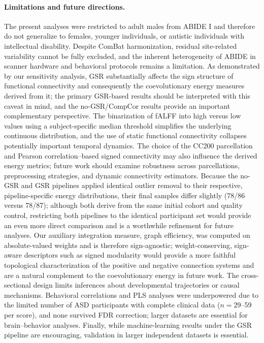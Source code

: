 \documentclass[10pt,letterpaper]{article}
\begin{document}
\paragraph*{Limitations and future directions.}
The present analyses were restricted to adult males from ABIDE I and therefore do not generalize
to females, younger individuals, or autistic individuals with intellectual disability. Despite
ComBat harmonization, residual site-related variability cannot be fully excluded, and the inherent
heterogeneity of ABIDE in scanner hardware and behavioral protocols remains a limitation. As
demonstrated by our sensitivity analysis, GSR substantially affects the sign structure of functional
connectivity and consequently the coevolutionary energy measures derived from it; the primary
GSR-based results should be interpreted with this caveat in mind, and the no-GSR/CompCor results
provide an important complementary perspective. The binarization of fALFF into high versus low
values using a subject-specific median threshold simplifies the underlying continuous distribution,
and the use of static functional connectivity collapses potentially important temporal dynamics.
The choice of the CC200 parcellation and Pearson correlation--based signed connectivity may also
influence the derived energy metrics; future work should examine robustness across parcellations,
preprocessing strategies, and dynamic connectivity estimators. Because the no-GSR and GSR pipelines
applied identical outlier removal to their respective, pipeline-specific energy distributions, their
final samples differ slightly (78/86 versus 78/87); although both derive from the same initial
cohort and quality control, restricting both pipelines to the identical participant set would provide
an even more direct comparison and is a worthwhile refinement for future analyses. Our auxiliary
integration measure, graph efficiency, was computed on absolute-valued weights and is therefore
sign-agnostic; weight-conserving, sign-aware descriptors such as signed modularity
\cite{RubinovSporns2011} would provide a more faithful topological characterization of the positive
and negative connection systems and are a natural complement to the coevolutionary energy in future
work. The cross-sectional design limits
inferences about developmental trajectories or causal mechanisms. Behavioral correlations and PLS
analyses were underpowered due to the limited number of ASD participants with complete clinical
data ($n = 29$--59 per score), and none survived FDR correction; larger datasets are essential
for brain--behavior analyses. Finally, while machine-learning results under the GSR pipeline are
encouraging, validation in larger independent datasets is essential.
\end{document}
